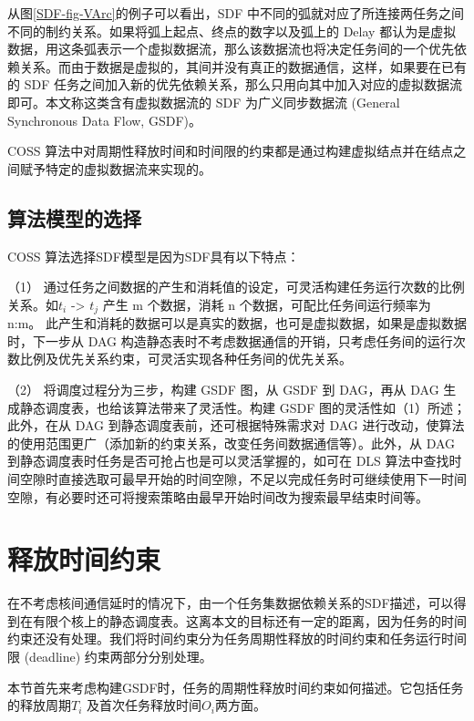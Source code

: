 从图\ref{SDF-fig-VArc}的例子可以看出，SDF 中不同的弧就对应了所连接两任务之间不同的制约关系。如果将弧上起点、终点的数字以及弧上的 Delay 都认为是虚拟数据，用这条弧表示一个虚拟数据流，那么该数据流也将决定任务间的一个优先依赖关系。而由于数据是虚拟的，其间并没有真正的数据通信，这样，如果要在已有的 SDF 任务之间加入新的优先依赖关系，那么只用向其中加入对应的虚拟数据流即可。本文称这类含有虚拟数据流的 SDF 为广义同步数据流 (General Synchronous Data Flow, GSDF)。

COSS 算法中对周期性释放时间和时间限的约束都是通过构建虚拟结点并在结点之间赋予特定的虚拟数据流来实现的。

\subsection{算法模型的选择}
COSS 算法选择SDF模型是因为SDF具有以下特点：

（1）	通过任务之间数据的产生和消耗值的设定，可灵活构建任务运行次数的比例关系。如$t_i$ -> $t_j$ 产生 m 个数据，消耗 n 个数据，可配比任务间运行频率为 n:m。 此产生和消耗的数据可以是真实的数据，也可是虚拟数据，如果是虚拟数据时，下一步从 DAG 构造静态表时不考虑数据通信的开销，只考虑任务间的运行次数比例及优先关系约束，可灵活实现各种任务间的优先关系。

（2）	将调度过程分为三步，构建 GSDF 图，从 GSDF 到 DAG，再从 DAG 生成静态调度表，也给该算法带来了灵活性。构建 GSDF 图的灵活性如（1）所述；此外，在从 DAG 到静态调度表前，还可根据特殊需求对 DAG 进行改动，使算法的使用范围更广（添加新的约束关系，改变任务间数据通信等）。此外，从 DAG 到静态调度表时任务是否可抢占也是可以灵活掌握的，如可在 DLS 算法中查找时间空隙时直接选取可最早开始的时间空隙，不足以完成任务时可继续使用下一时间空隙，有必要时还可将搜索策略由最早开始时间改为搜索最早结束时间等。


\section{释放时间约束}

在不考虑核间通信延时的情况下，由一个任务集数据依赖关系的SDF描述，可以得到在有限个核上的静态调度表。这离本文的目标还有一定的距离，因为任务的时间约束还没有处理。我们将时间约束分为任务周期性释放的时间约束和任务运行时间限 (deadline) 约束两部分分别处理。

本节首先来考虑构建GSDF时，任务的周期性释放时间约束如何描述。它包括任务的释放周期$T_i$ 及首次任务释放时间$O_i$两方面。

